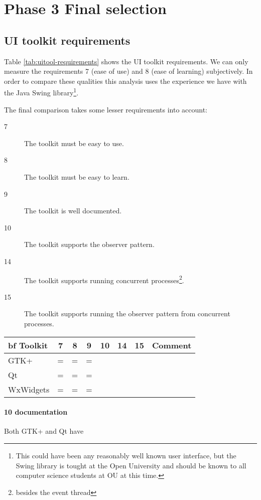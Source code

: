 \section{Phase 3 Final selection}

\subsection{UI toolkit requirements} 

Table \ref{tab:uitool-requirements} shows the UI toolkit requirements. 
We can only measure the requirements 7 (ease of use) and 8 (ease of learning) 
subjectively. In order to compare these qualities this analysis 
uses the experience we have with the Java Swing library\footnote{This 
could have been any reasonably well known user interface, but the Swing library 
is tought at the Open University and should be known to all computer science 
students at OU at this time.}.

The final comparison takes some lesser requirements into account:

\begin{description}
	\item[7] The toolkit must be easy to use. 
	\item[8] The toolkit must be easy to learn.
	\item[9] The toolkit is well documented.
	\item[10] The toolkit supports the observer pattern.
	\item[14] The toolkit supports running concurrent processes\footnote{besides the event thread}.
	\item[15] The toolkit supports running the observer pattern
	from concurrent processes.
\end{description}

\begin{center}
	\small\sf
	\begin{tabular}{l|cccccc|p{15em}}
		\hline
		{bf Toolkit} & {\bf 7} & {\bf 8} & {\bf 9} & {\bf 10} & {\bf 14} & {\bf 15} & {\bf Comment}\\
		\hline
		GTK+         &   =     &    =    &   =     &          &          &          &  \\
		Qt           &   =     &    =    &   =     &          &          &          &  \\
		WxWidgets    &   =     &    =    &   =     &          &          &          &  \\
		\hline
	\end{tabular}
\end{center}

\paragraph{10 documentation} Both GTK+ and Qt have 
